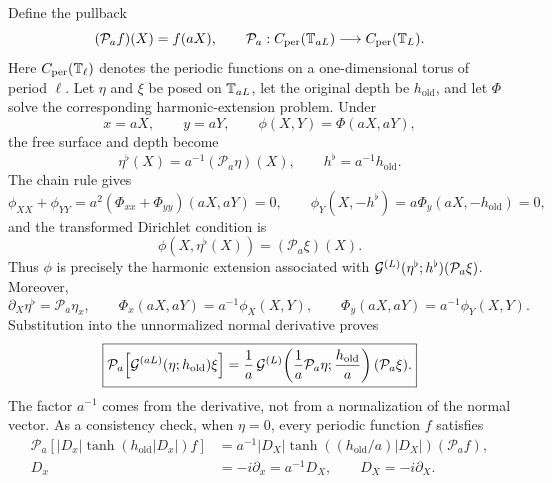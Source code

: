Define the pullback
\begin{equation}
  (\mathcal P_a f)(X)=f(aX),
  \qquad \mathcal P_a:C_{\mathrm{per}}(\mathbb{T}_{aL})
  \longrightarrow C_{\mathrm{per}}(\mathbb{T}_L).
  \label{eq:rescaling-pullback}
\end{equation}
Here \(C_{\mathrm{per}}(\mathbb{T}_\ell)\) denotes the periodic functions on a
one-dimensional torus of period \(\ell\).
Let $\eta$ and $\xi$ be posed on $\mathbb{T}_{aL}$, let the original depth be
$h_{\mathrm{old}}$, and let $\Phi$ solve the corresponding harmonic-extension
problem.  Under
\begin{equation}
  x=aX,\qquad y=aY,\qquad
  \phi(X,Y)=\Phi(aX,aY),
  \label{eq:rescaling-coordinates}
\end{equation}
the free surface and depth become
\begin{equation}
  \eta^\flat(X)=a^{-1}(\mathcal P_a\eta)(X),
  \qquad h^\flat=a^{-1}h_{\mathrm{old}}.
  \label{eq:rescaling-geometry}
\end{equation}
The chain rule gives
\[
  \phi_{XX}+\phi_{YY}
  =a^2(\Phi_{xx}+\Phi_{yy})(aX,aY)=0,
  \qquad
  \phi_Y(X,-h^\flat)=a\Phi_y(aX,-h_{\mathrm{old}})=0,
\]
and the transformed Dirichlet condition is
\[
  \phi(X,\eta^\flat(X))=(\mathcal P_a\xi)(X).
\]
Thus $\phi$ is precisely the harmonic extension associated with
$\mathcal{G}^{(L)}(\eta^\flat;h^\flat)(\mathcal P_a\xi)$.  Moreover,
\begin{equation}
  \partial_X\eta^\flat=\mathcal P_a\eta_x,
  \qquad
  \Phi_x(aX,aY)=a^{-1}\phi_X(X,Y),
  \qquad
  \Phi_y(aX,aY)=a^{-1}\phi_Y(X,Y).
  \label{eq:rescaling-chain-rule}
\end{equation}
Substitution into the unnormalized normal derivative proves
\begin{equation}
  \boxed{
  \mathcal P_a\!\left[
    \mathcal{G}^{(aL)}(\eta;h_{\mathrm{old}})\xi
  \right]
  =\frac1a\,
  \mathcal{G}^{(L)}\!\left(
    \frac1a\mathcal P_a\eta;\frac{h_{\mathrm{old}}}{a}
  \right)(\mathcal P_a\xi).}
  \label{eq:dno-rescaling}
\end{equation}
The factor $a^{-1}$ comes from the derivative, not from a normalization of the
normal vector. As a consistency check, when $\eta=0$, every periodic function
\(f\) satisfies
\[
  \begin{aligned}
  \mathcal P_a\!\left[
    |D_x|\tanh(h_{\mathrm{old}}|D_x|)f
  \right]
  &=a^{-1}|D_X|\tanh((h_{\mathrm{old}}/a)|D_X|)
    (\mathcal P_a f),\\
  D_x&=-i\partial_x=a^{-1}D_X,
  \qquad D_X=-i\partial_X.
  \end{aligned}
\]

